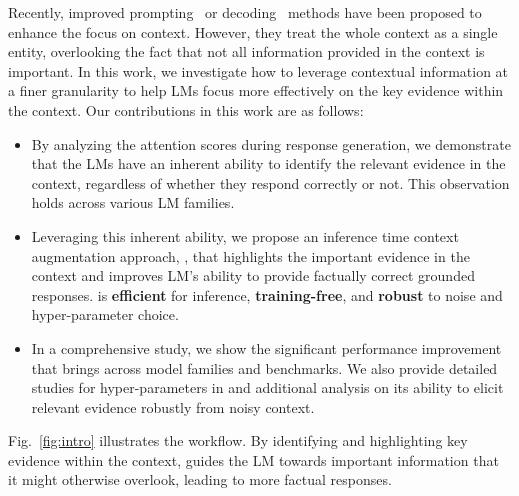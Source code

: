 Recently, improved prompting~\cite{zhou2023prompt} or decoding~\cite{shi2024cad} methods have been proposed to enhance the focus on context. However, they treat the whole context as a single entity, overlooking the fact that not all information provided in the context is important.
In this work, we investigate how to leverage contextual information at a finer granularity to help LMs focus more effectively on the key evidence within the context. 
Our contributions in this work are as follows:
\begin{itemize}
    \item By analyzing the attention scores during response generation, we demonstrate that the LMs have an inherent ability to identify the relevant evidence in the context, regardless of whether they respond correctly or not. This observation holds across various LM families.
    \item Leveraging this inherent ability, we propose an inference time context augmentation approach, \se, that highlights the important evidence in the context and improves LM's ability to provide factually correct grounded responses. \se is \textbf{efficient} for inference, \textbf{training-free}, and \textbf{robust} to noise and hyper-parameter choice.
    \item In a comprehensive study, we show the significant performance improvement that \se brings across model families and benchmarks. We also provide detailed studies for hyper-parameters in \se and additional analysis on its ability to elicit relevant evidence robustly from noisy context.
\end{itemize}
Fig.~\ref{fig:intro} illustrates the \se workflow. By identifying and highlighting key evidence within the context, \se guides the LM towards important information that it might otherwise overlook, leading to more factual responses.